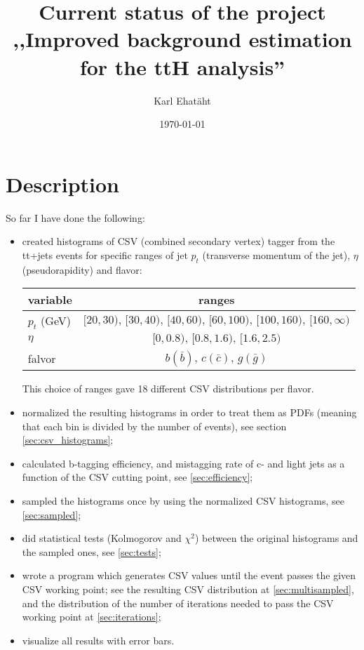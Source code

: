 \documentclass[12pt,a4paper]{article}
\title{\TitleFont\textbf{Current status of the project\\
,,Improved background estimation for the ttH analysis''}}
\author{Karl Ehatäht}
\date\today
\begin{document}
\maketitle

\section{Description}

So far I have done the following:
\begin{itemize}
\item created histograms of CSV (combined secondary vertex) tagger from the tt+jets events for specific ranges of jet $p_t$ (transverse momentum of the jet), $\eta$ (pseudorapidity) and flavor:
\begin{center}
	\begin{tabular}{ l | c }
		\hline
		variable & ranges \\ \hline
		$p_t$ (GeV) & $[20,30),\,[30,40),\,[40,60),\,[60,100),\,[100,160),\,[160,\infty)$ \\ \hline
		$\eta$ & $[0,0.8),\,[0.8,1.6),\,[1.6,2.5)$ \\ \hline
		falvor & $b(\bar{b})$, $c(\bar{c})$, $g(\bar{g})$ \\
	\end{tabular}
\end{center}
This choice of ranges gave 18 different CSV distributions per flavor.
\item normalized the resulting histograms in order to treat them as PDFs (meaning that each bin is divided by the number of events), see section \ref{sec:csv_histograms};
\item calculated b-tagging efficiency, and mistagging rate of c- and light jets as a function of the CSV cutting point, see \ref{sec:efficiency};
\item sampled the histograms once by using the normalized CSV histograms, see \ref{sec:sampled};
\item did statistical tests (Kolmogorov and $\chi^2$) between the original histograms and the sampled ones, see \ref{sec:tests};
\item wrote a program which generates CSV values until the event passes the given CSV working point; see the resulting CSV distribution at \ref{sec:multisampled}, and the distribution of the number of iterations needed to pass the CSV working point at \ref{sec:iterations};
\item visualize all results with error bars.
\end{itemize}
\end{document}
